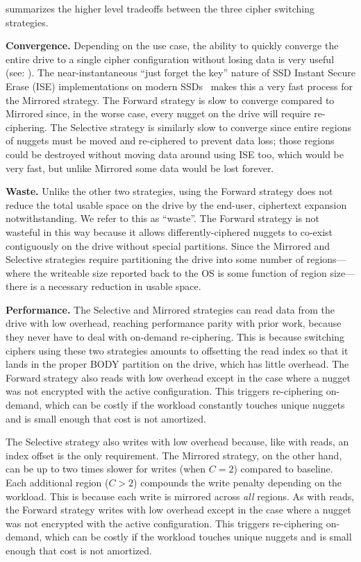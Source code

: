 


 summarizes the higher level tradeoffs between the
three cipher switching strategies.

\textbf{Convergence.} Depending on the use case, the ability to quickly converge
the entire drive to a single cipher configuration without losing data is very
useful (see: ). The near-instantaneous ``just forget the key''
nature of SSD Instant Secure Erase (ISE) implementations on modern
SSDs~\cite{ISE1,ISE2,ISE3} makes this a very fast process for the Mirrored
strategy. The Forward strategy is slow to converge compared to Mirrored since,
in the worse case, every nugget on the drive will require re-ciphering. The
Selective strategy is similarly slow to converge since entire regions of nuggets
must be moved and re-ciphered to prevent data loss; those regions could be
destroyed without moving data around using ISE too, which would be very fast,
but unlike Mirrored some data would be lost forever.

\textbf{Waste.} Unlike the other two strategies, using the Forward strategy does
not reduce the total usable space on the drive by the end-user, ciphertext
expansion notwithstanding. We refer to this as ``waste''. The Forward strategy
is not wasteful in this way because it allows differently-ciphered nuggets to
co-exist contiguously on the drive without special partitions. Since the
Mirrored and Selective strategies require partitioning the drive into some
number of regions---where the writeable size reported back to the OS is some
function of region size---there is a necessary reduction in usable space.

\textbf{Performance.} The Selective and Mirrored strategies can read data from
the drive with low overhead, reaching performance parity with prior work,
because they never have to deal with on-demand re-ciphering. This is because
switching ciphers using these two strategies amounts to offsetting the read
index so that it lands in the proper BODY partition on the drive, which has
little overhead. The Forward strategy also reads with low overhead except in the
case where a nugget was not encrypted with the active configuration. This
triggers re-ciphering on-demand, which can be costly if the workload constantly
touches unique nuggets and is small enough that cost is not amortized.

The Selective strategy also writes with low overhead because, like with reads,
an index offset is the only requirement. The Mirrored strategy, on the other
hand, can be up to two times slower for writes (when $C = 2$) compared to
baseline. Each additional region ($C > 2$) compounds the write penalty depending
on the workload. This is because each write is mirrored across \emph{all}
regions. As with reads, the Forward strategy writes with low overhead except in
the case where a nugget was not encrypted with the active configuration. This
triggers re-ciphering on-demand, which can be costly if the workload touches
unique nuggets and is small enough that cost is not amortized.\\

